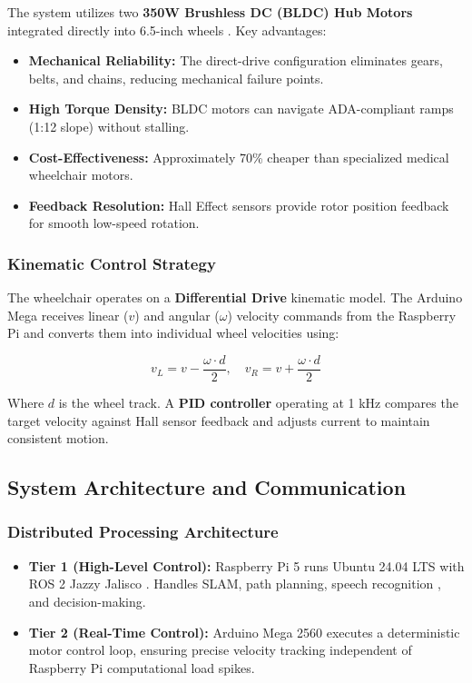 \documentclass[12pt,a4paper]{report}
\begin{document}
The system utilizes two \textbf{350W Brushless DC (BLDC) Hub Motors} integrated directly into 6.5-inch wheels \cite{bldc_foc}. Key advantages:

\begin{itemize}
    \item \textbf{Mechanical Reliability:} The direct-drive configuration eliminates gears, belts, and chains, reducing mechanical failure points.
    \item \textbf{High Torque Density:} BLDC motors can navigate ADA-compliant ramps (1:12 slope) without stalling.
    \item \textbf{Cost-Effectiveness:} Approximately 70\% cheaper than specialized medical wheelchair motors.
    \item \textbf{Feedback Resolution:} Hall Effect sensors provide rotor position feedback for smooth low-speed rotation.
\end{itemize}

\subsubsection{Kinematic Control Strategy}

The wheelchair operates on a \textbf{Differential Drive} kinematic model. The Arduino Mega receives linear ($v$) and angular ($\omega$) velocity commands from the Raspberry Pi and converts them into individual wheel velocities using:

\begin{equation}
    v_L = v - \frac{\omega \cdot d}{2}, \quad v_R = v + \frac{\omega \cdot d}{2}
\end{equation}

Where $d$ is the wheel track. A \textbf{PID controller} \cite{pid_control} operating at 1 kHz compares the target velocity against Hall sensor feedback and adjusts current to maintain consistent motion.

\subsection{System Architecture and Communication}

\subsubsection{Distributed Processing Architecture}

\begin{itemize}
    \item \textbf{Tier 1 (High-Level Control):} Raspberry Pi 5 runs Ubuntu 24.04 LTS with ROS 2 Jazzy Jalisco \cite{ros2}. Handles SLAM, path planning, speech recognition , and decision-making.
    \item \textbf{Tier 2 (Real-Time Control):} Arduino Mega 2560 executes a deterministic motor control loop, ensuring precise velocity tracking independent of Raspberry Pi computational load spikes.
\end{itemize}
\end{document}
